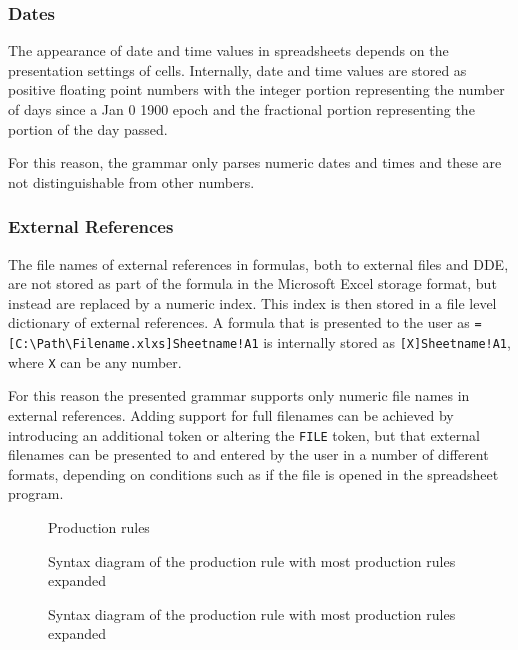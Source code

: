 \documentclass[conference]{IEEEtran}
\begin{document}
\subsubsection{\textbf{Dates}}

The appearance of date and time values in spreadsheets depends on the presentation settings of cells. Internally, date and time values are stored as positive floating point numbers with the integer portion representing the number of days since a Jan 0 1900 epoch and the fractional portion representing the portion of the day passed.

For this reason, the grammar only parses numeric dates and times and these are not distinguishable from other numbers.

\subsubsection{\textbf{External References}}

The file names of external references in formulas, both to external files and DDE, are not stored as part of the formula in the Microsoft Excel storage format, but instead are replaced by a numeric index.
This index is then stored in a file level dictionary of external references.
A formula that is presented to the user as \texttt{=[C:\textbackslash Path\textbackslash Filename.xlxs]Sheetname!A1} is internally stored as \texttt{[X]Sheetname!A1}, where \texttt{X} can be any number.

For this reason the presented grammar supports only numeric file names in external references.
Adding support for full filenames can be achieved by introducing an additional token or altering the \texttt{FILE} token, but that external filenames can be presented to and entered by the user in a number of different formats, depending on conditions such as if the file is opened in the spreadsheet program.

\begin{figure}
\caption{Production rules}
\label{figure:productions}
\centering

\end{figure}

\begin{figure}
	\caption{Syntax diagram of the  production rule with most production rules expanded}
	\label{figure:Formula}
	
\end{figure}
\begin{figure}
	\caption{Syntax diagram of the  production rule with most production rules expanded}
	\label{figure:Reference}
	\centering
	
\end{figure}
\end{document}

